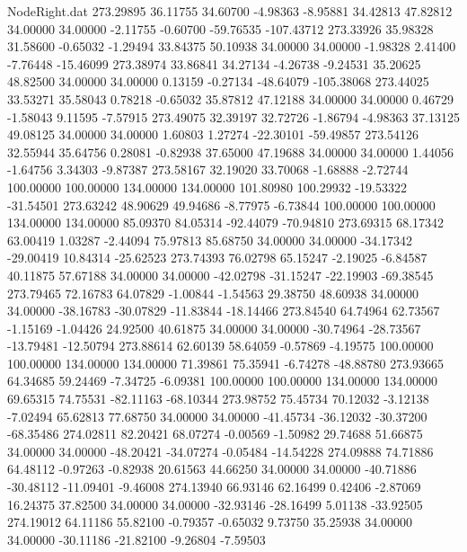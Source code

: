 \begin{filecontents}{NodeRight.dat}
 273.29895   36.11755   34.60700    -4.98363   -8.95881   34.42813   47.82812   34.00000   34.00000   -2.11755   -0.60700  -59.76535 -107.43712
 273.33926   35.98328   31.58600    -0.65032   -1.29494   33.84375   50.10938   34.00000   34.00000   -1.98328    2.41400   -7.76448  -15.46099
 273.38974   33.86841   34.27134    -4.26738   -9.24531   35.20625   48.82500   34.00000   34.00000    0.13159   -0.27134  -48.64079 -105.38068
 273.44025   33.53271   35.58043     0.78218   -0.65032   35.87812   47.12188   34.00000   34.00000    0.46729   -1.58043    9.11595   -7.57915
 273.49075   32.39197   32.72726    -1.86794   -4.98363   37.13125   49.08125   34.00000   34.00000    1.60803    1.27274  -22.30101  -59.49857
 273.54126   32.55944   35.64756     0.28081   -0.82938   37.65000   47.19688   34.00000   34.00000    1.44056   -1.64756    3.34303   -9.87387
 273.58167   32.19020   33.70068    -1.68888   -2.72744  100.00000  100.00000  134.00000  134.00000  101.80980  100.29932  -19.53322  -31.54501
 273.63242   48.90629   49.94686    -8.77975   -6.73844  100.00000  100.00000  134.00000  134.00000   85.09370   84.05314  -92.44079  -70.94810
 273.69315   68.17342   63.00419     1.03287   -2.44094   75.97813   85.68750   34.00000   34.00000  -34.17342  -29.00419   10.84314  -25.62523
 273.74393   76.02798   65.15247    -2.19025   -6.84587   40.11875   57.67188   34.00000   34.00000  -42.02798  -31.15247  -22.19903  -69.38545
 273.79465   72.16783   64.07829    -1.00844   -1.54563   29.38750   48.60938   34.00000   34.00000  -38.16783  -30.07829  -11.83844  -18.14466
 273.84540   64.74964   62.73567    -1.15169   -1.04426   24.92500   40.61875   34.00000   34.00000  -30.74964  -28.73567  -13.79481  -12.50794
 273.88614   62.60139   58.64059    -0.57869   -4.19575  100.00000  100.00000  134.00000  134.00000   71.39861   75.35941   -6.74278  -48.88780
 273.93665   64.34685   59.24469    -7.34725   -6.09381  100.00000  100.00000  134.00000  134.00000   69.65315   74.75531  -82.11163  -68.10344
 273.98752   75.45734   70.12032    -3.12138   -7.02494   65.62813   77.68750   34.00000   34.00000  -41.45734  -36.12032  -30.37200  -68.35486
 274.02811   82.20421   68.07274    -0.00569   -1.50982   29.74688   51.66875   34.00000   34.00000  -48.20421  -34.07274   -0.05484  -14.54228
 274.09888   74.71886   64.48112    -0.97263   -0.82938   20.61563   44.66250   34.00000   34.00000  -40.71886  -30.48112  -11.09401   -9.46008
 274.13940   66.93146   62.16499     0.42406   -2.87069   16.24375   37.82500   34.00000   34.00000  -32.93146  -28.16499    5.01138  -33.92505
 274.19012   64.11186   55.82100    -0.79357   -0.65032    9.73750   35.25938   34.00000   34.00000  -30.11186  -21.82100   -9.26804   -7.59503

\end{filecontents}
